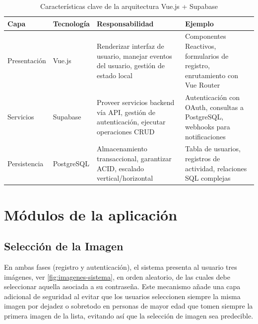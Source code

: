 \begin{table}[ht]
	\centering
	\caption{Características clave de la arquitectura Vue.js + Supabase}
	\label{tab:arquitectura}
	\begin{tabular}{|p{2.5cm}|p{3cm}|p{5cm}|p{5cm}|} %
		\hline
		\rowcolor{gray!20} %
		\textbf{Capa} & \textbf{Tecnología} & \textbf{Responsabilidad} & \textbf{Ejemplo} \\
		\hline
		
		Presentación & Vue.js & 
		Renderizar interfaz de usuario, manejar eventos del usuario, gestión de estado local & 
		Componentes Reactivos, formularios de registro, enrutamiento con Vue Router \\
		\hline
		
		Servicios & Supabase & 
		Proveer servicios backend vía API, gestión de autenticación, ejecutar operaciones CRUD & 
		Autenticación con OAuth, consultas a PostgreSQL, webhooks para notificaciones \\
		\hline
		
		Persistencia & PostgreSQL & 
		Almacenamiento transaccional, garantizar ACID, escalado vertical/horizontal & 
		Tabla de usuarios, registros de actividad, relaciones SQL complejas \\
		\hline
	\end{tabular}
\end{table}


\section{M\'odulos de la aplicaci\'on}

\subsection{Selección de la Imagen}
\label{subsec:seleccion-imagen}

En ambas fases (registro y autenticación), el sistema presenta al usuario tres imágenes, ver \ref{fig:imagenes-sistema}, en orden aleatorio, de las cuales debe seleccionar aquella asociada a su contraseña. Este mecanismo añade una capa adicional de seguridad al evitar que los usuarios seleccionen siempre la misma imagen por dejadez o sobretodo en personas de mayor edad que tomen siempre la primera imagen de la lista, evitando as\'i que la selecci\'on de imagen sea predecible. 


